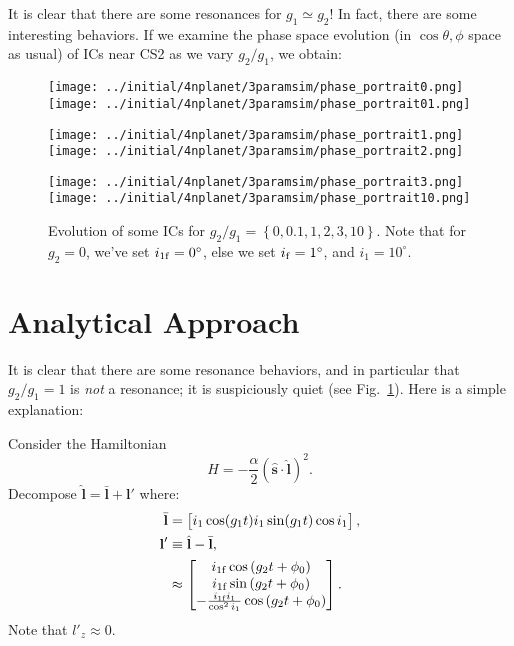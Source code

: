 \documentclass[11pt,
        usenames, %
        dvipsnames %
    ]{article}
\newcommand*{\bm}[1]{\boldsymbol{\mathbf{#1}}}
\newcommand*{\uv}[1]{\hat{\bm{#1}}}
\newcommand*{\p}[1]{\left(#1\right)}
\newcommand*{\z}[1]{\left\{#1\right\}}
\begin{document}
It is clear that there are some resonances for $g_1 \simeq g_2$! In fact, there
are some interesting behaviors. If we examine the phase space evolution (in
$\cos \theta, \phi$ space as usual) of ICs near CS2 as we vary $g_2 / g_1$, we
obtain:
\begin{figure}
    \centering
    \texttt{[image: ../initial/4nplanet/3paramsim/phase\_portrait0.png]}
    \texttt{[image: ../initial/4nplanet/3paramsim/phase\_portrait01.png]}

    \texttt{[image: ../initial/4nplanet/3paramsim/phase\_portrait1.png]}
    \texttt{[image: ../initial/4nplanet/3paramsim/phase\_portrait2.png]}

    \texttt{[image: ../initial/4nplanet/3paramsim/phase\_portrait3.png]}
    \texttt{[image: ../initial/4nplanet/3paramsim/phase\_portrait10.png]}
    \caption{Evolution of some ICs for $g_2 / g_1 = \z{0, 0.1, 1, 2, 3, 10}$.
    Note that for $g_2 = 0$, we've set $i_{\rm 1f} = 0^\circ$, else we set
    $i_{\rm f} = 1^\circ$, and $i_1 = 10^\circ$.
    }\label{fig:phase_portraits}
\end{figure}

\section{Analytical Approach}

It is clear that there are some resonance behaviors, and in particular that $g_2
/ g_1 = 1$ is \emph{not} a resonance; it is suspiciously quiet (see
Fig.~\ref{fig:phase_portraits}). Here is a simple explanation:

Consider the Hamiltonian
\begin{equation}
    H = - \frac{\alpha}{2}\p{\uv{s} \cdot \uv{l}}^2.
\end{equation}
Decompose $\uv{l} = \bar{\bm{l}} + \bm{l}'$ where:
\begin{align}
    \bar{\bm{l}} &= \begin{bmatrix}
        i_1 \cos (g_1t)
        i_1 \sin (g_1t)
        \cos i_1
    \end{bmatrix},\\
    \bm{l}' &\equiv \uv{l} - \bar{\bm{l}},\\
        &\approx \begin{bmatrix}
        i_{\rm 1f} \cos\p{g_2 t + \phi_0}\\
        i_{\rm 1f} \sin\p{g_2 t + \phi_0}\\
        -\frac{i_{\rm 1f}i_1}{\cos^2 i_1} \cos\p{g_2t + \phi_0}
    \end{bmatrix}.
\end{align}
Note that $l'_z \approx 0$.
\end{document}
